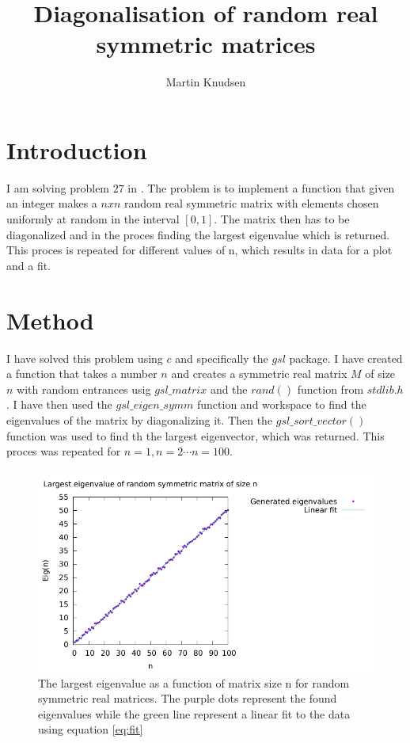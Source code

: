 \documentclass{report}
\author{Martin Knudsen}
\title{Diagonalisation of random real symmetric matrices}
\begin{document}
\maketitle

\section*{Introduction}
I am solving problem $27$ in \cite{fedorov}. 
The problem is to implement a function that given an integer makes a $n x n$ random real symmetric matrix with elements chosen uniformly at random in the interval $[0, 1]$. The matrix then has to be diagonalized and in the proces finding the largest eigenvalue which is returned. This proces is repeated for different values of n, which results in data for a plot and a fit. 


\section*{Method}
I have solved this problem using $c$ and specifically the $gsl$ package. I have created a function that takes a number $n$ and creates a symmetric real matrix $M$ of size $n$ with random entrances usig $gsl\_matrix$ and the $rand()$ function from $stdlib.h$. I have then used the $gsl\_eigen\_symm$ function and workspace to find the eigenvalues of the matrix by diagonalizing it. Then the $gsl\_sort\_vector()$ function was used to find th the largest eigenvector, which was returned. This proces was repeated for $n=1, n=2\cdots n=100$. 
\begin{figure}[tbhp]
\includegraphics[width = \textwidth]{Eigenvalue}
\caption{The largest eigenvalue as a function of matrix size n for random symmetric real matrices. The purple dots represent the found eigenvalues while the green line represent a linear fit to the data using equation \eqref{eq:fit} \label{fig:eigen}}
\end{figure}
\end{document}
